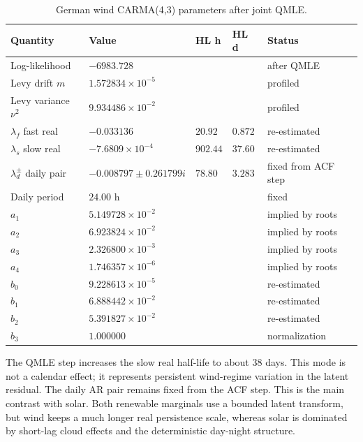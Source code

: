 \begin{table}[!htbp]
  \centering
  \caption{German wind CARMA(4,3) parameters after joint QMLE.}
  \label{tab:wind-carma-after-qmle}
  \begin{tabular}{@{}lllll@{}}
    \toprule
    Quantity & Value & HL h & HL d & Status \\
    \midrule
    Log-likelihood & \(-6983.728\) & & & after QMLE \\
    Levy drift \(m\) & \(1.572834{\times}10^{-5}\) & & & profiled \\
    Levy variance \(\nu^2\) & \(9.934486{\times}10^{-2}\) & & & profiled \\
    \midrule
    \(\lambda_f\) fast real & \(-0.033136\) & \(20.92\) & \(0.872\) & re-estimated \\
    \(\lambda_s\) slow real & \(-7.6809{\times}10^{-4}\) & \(902.44\) & \(37.60\) & re-estimated \\
    \(\lambda_d^\pm\) daily pair & \(-0.008797\pm0.261799i\) & \(78.80\) & \(3.283\) & fixed from ACF step \\
    Daily period & \(24.00\) h & & & fixed \\
    \midrule
    \(a_1\) & \(5.149728{\times}10^{-2}\) & & & implied by roots \\
    \(a_2\) & \(6.923824{\times}10^{-2}\) & & & implied by roots \\
    \(a_3\) & \(2.326800{\times}10^{-3}\) & & & implied by roots \\
    \(a_4\) & \(1.746357{\times}10^{-6}\) & & & implied by roots \\
    \midrule
    \(b_0\) & \(9.228613{\times}10^{-5}\) & & & re-estimated \\
    \(b_1\) & \(6.888442{\times}10^{-2}\) & & & re-estimated \\
    \(b_2\) & \(5.391827{\times}10^{-2}\) & & & re-estimated \\
    \(b_3\) & \(1.000000\) & & & normalization \\
    \bottomrule
  \end{tabular}
\end{table}

\FloatBarrier

The QMLE step increases the slow real half-life to about 38 days. This mode is
not a calendar effect; it represents persistent wind-regime variation in the
latent residual. The daily AR pair remains fixed from the ACF step.
This is the main contrast with solar. Both renewable marginals use a bounded
latent transform, but wind keeps a much longer real persistence scale, whereas
solar is dominated by short-lag cloud effects and the deterministic day-night
structure.

